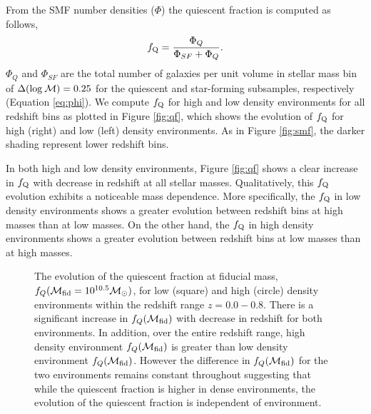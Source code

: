 \documentclass{emulateapj}
\begin{document}
From the SMF number densities ($\Phi$) the quiescent fraction is computed as follows, 
\begin{equation}
f_{\rm{Q}} = \frac{\Phi_{Q}}{\Phi_{SF}+\Phi_{Q}}.
\end{equation}
$\Phi_{Q}$ and $\Phi_{SF}$ are the total number of galaxies per unit volume in stellar mass bin of $\Delta(\rm{log} \: \mathcal{M}) = 0.25$ for the quiescent and star-forming subsamples, respectively (Equation \ref{eq:phi}). We compute $f_{\rm{Q}}$ for high and low density environments for all redshift bins as plotted in Figure \ref{fig:qf}, which shows the evolution of $f_{\rm{Q}}$ for high (right) and low (left) density environments. As in Figure \ref{fig:smf}, the darker shading represent lower redshift bins. 

In both high and low density environments, Figure \ref{fig:qf} shows a clear increase in $f_{\rm{Q}}$ with decrease in redshift at all stellar masses. Qualitatively, this $f_{\rm{Q}}$ evolution exhibits a noticeable mass dependence. More specifically, the $f_{\rm{Q}}$ in low density environments shows a greater evolution between redshift bins at high masses than at low masses. On the other hand, the $f_{\rm{Q}}$ in high density environments shows a greater evolution between redshift bins at low masses than at high masses.

\begin{figure}
    \begin{center}
        \leavevmode
        \caption{The evolution of the quiescent fraction at fiducial mass, $f_{Q}(\mathcal{M}_{\rm{fid}} = 10^{10.5} \mathcal{M}_\odot)$, for low (square) and high (circle) density environments within the redshift range $z = 0.0 - 0.8$.  There is a significant increase in $f_{Q}(\mathcal{M}_{\rm{fid}})$ with decrease in redshift for both environments. In addition, over the entire redshift range, high density environment $f_{Q}(\mathcal{M}_{\rm{fid}})$ is greater than low density environment $f_{Q}(\mathcal{M}_{\rm{fid}})$. However the difference in $f_{Q}(\mathcal{M}_{\rm{fid}})$ for the two environments remains constant throughout suggesting that while the quiescent fraction is higher in dense environments, the evolution of the quiescent fraction is independent of environment.}         \label{fig:qffit}
    \end{center}
\end{figure}
\end{document}

